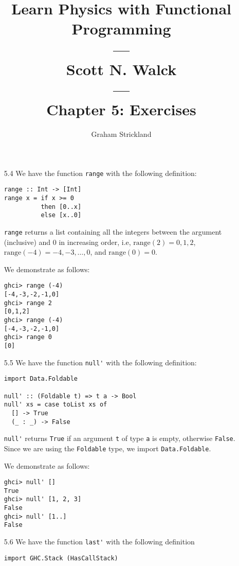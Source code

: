 \documentclass{article}
\title{
    Learn Physics with Functional Programming\\---\\Scott N. Walck\\---\\
    Chapter 5: Exercises
}
\author{Graham Strickland}
\begin{document}
\maketitle  

    \begin{itemize}
        \item[5.4] We have the function \verb|range| with the following definition:
        \begin{verbatim}
range :: Int -> [Int]
range x = if x >= 0
          then [0..x]
          else [x..0]
        \end{verbatim}
        \verb|range| returns a list containing all the integers between the argument 
        (inclusive) and 0 in increasing order, i.e, $\text{range}(2) = 0, 1, 2$, 
        $\text{range}(-4) = -4, -3, \ldots, 0$, and $\text{range}(0) = 0$.\par
        \qquad We demonstrate as follows:
        \begin{verbatim}
ghci> range (-4)
[-4,-3,-2,-1,0]
ghci> range 2
[0,1,2]
ghci> range (-4)
[-4,-3,-2,-1,0]
ghci> range 0
[0]
        \end{verbatim}
        \item[5.5] We have the function \verb|null'| with the following definition:
        \begin{verbatim}
import Data.Foldable

null' :: (Foldable t) => t a -> Bool
null' xs = case toList xs of
  [] -> True
  (_ : _) -> False
        \end{verbatim}
        \verb|null'| returns \verb|True| if an argument \verb|t| of type \verb|a| 
        is empty, otherwise \verb|False|. Since we are using the \verb|Foldable| 
        type, we import \verb|Data.Foldable|.\par
        \qquad We demonstrate as follows:
        \begin{verbatim}
ghci> null' []
True
ghci> null' [1, 2, 3]
False
ghci> null' [1..]
False
        \end{verbatim}
        \item[5.6] We have the function \verb|last'| with the following definition
        \begin{verbatim}
import GHC.Stack (HasCallStack)


\end{verbatim}
\end{itemize}
\end{document}
